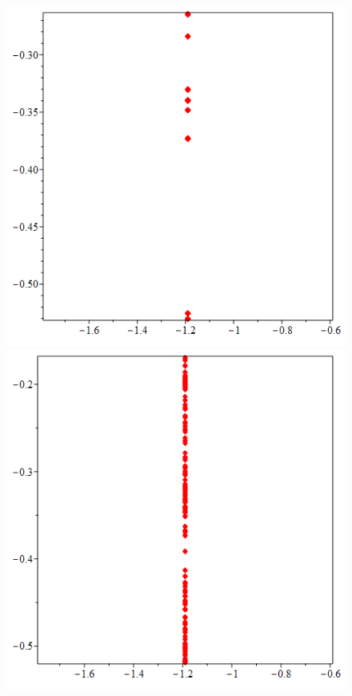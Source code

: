 \documentclass[10pt,a4paper]{article}
\begin{document}
\begin{figure}[h]
		{\includegraphics[scale=0.2]{poincare f=0.7}}
		{\includegraphics[scale=0.2]{poincare f=0.745}}

\end{figure}
\end{document}
